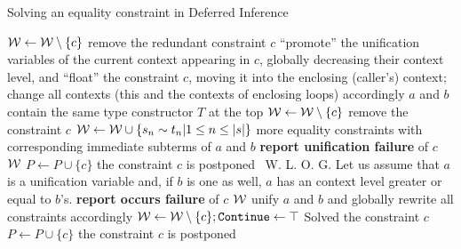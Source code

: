 \begin{algorithm}
    \caption{Solving an equality constraint in Deferred Inference}
    \label{case_equality}
    \begin{algorithmic}
        \State $\mathcal W \gets \mathcal W \setminus \{c\}$ \Comment remove the redundant constraint $c$
            \State ``promote'' the unification variables of the current context appearing in $c$, globally decreasing their context level, and ``float'' the constraint $c$, moving it into the enclosing (caller's) context; change all contexts (this and the contexts of enclosing loops) accordingly
             \Comment $a$ and $b$ contain the same type constructor $T$ at the top
                \State $\mathcal W \gets \mathcal W \setminus \{c\}$ \Comment remove the constraint $c$
                \State $\mathcal W \gets \mathcal W \cup \{s_n \sim t_n | 1 \leq n \leq |s|\}$ \Comment more equality constraints with corresponding immediate subterms of $a$ and $b$
             
                \State \textbf{report unification failure} of $c$
                \State \Return $\mathcal W$
            \Else {}
            \State $P \gets P \cup \{c\}$ \Comment the constraint $c$ is postponed
            \EndIf
        \Else
            \ {W. L. O. G. Let us assume that $a$ is a unification variable and, if $b$ is one as well, $a$ has an context level greater or equal to $b$'s.}
                \State \textbf{report occurs failure} of $c$
                \State \Return $\mathcal W$
                \State unify $a$ and $b$ and globally rewrite all constraints accordingly
                \State $\mathcal W \gets \mathcal W \setminus \{c\}; \mathtt{Continue} \gets \top$ \Comment Solved the constraint $c$
            \Else
                \State $P \gets P \cup \{c\}$ \Comment the constraint $c$ is postponed
            \EndIf
        \EndIf
    \end{algorithmic}
\end{algorithm}

